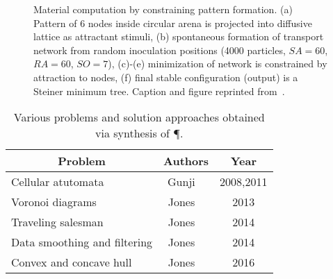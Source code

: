 			\begin{figure}
				\centering
				\newline
				
				
				\caption[Multi-agent \P \ - Evolution of agents]{Material computation by constraining pattern formation. (a) Pattern of $6$ nodes inside circular arena is projected into diffusive lattice as attractant stimuli, (b) spontaneous formation of transport network from random inoculation positions (4000 particles, $SA = 60$, $RA = 60$, $SO = 7$), (c)-(e) minimization of network is constrained by attraction to nodes, (f) final stable configuration (output) is a Steiner minimum tree. Caption and figure reprinted from~\cite{jones2016multi}.}
				\label{fig:agent_mst}
			\end{figure}

			\begin{table}
				\centering
				\begin{tabular}{@{} l *2c @{}}
				\toprule
				 \multicolumn{1}{c}{Problem}    & Authors  & Year   \\ 
				\midrule
				 Cellular atutomata & Gunji \etal~\cite{gunji2008minimal,gunji2011adaptive}  & 2008,2011 \\ 
				 Voronoi diagrams & Jones \etal~\cite{jones2015slime} & 2013 \\ 
				 Traveling salesman & Jones \etal~\cite{jones2014computation} & 2014 \\ 
				 Data smoothing and filtering & Jones \etal~\cite{jones2014material} & 2014 \\ 
				 Convex and concave hull & Jones \etal~\cite{jones2016multi} & 2016 \\ 
				
				


				\bottomrule
				\end{tabular}
				\caption[Computing by synthesis of \P]{Various problems and solution approaches obtained via synthesis of \P.}
				\label{tab:list_synthesize}
			\end{table}

